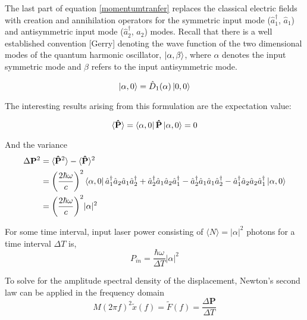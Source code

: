 		The last part of equation \ref{momentumtranfer} replaces the classical electric fields with creation and annihilation operators for the symmetric input mode ($\hat{a}_1^{\dagger}$, $\hat{a}_1$) and antisymmetric input mode ($\hat{a}_2^{\dagger}$, $\hat{a}_2$) modes. Recall that there is a well established convention [Gerry] denoting the wave function of the two dimensional modes of the quantum harmonic oscillator, $\ket{\alpha,\beta}$, where $\alpha$ denotes the input symmetric mode and $\beta$ refers to the input antisymmetric mode.
		
		\begin{equation}
		\ket{\alpha,0} = \hat{D}_1(\alpha) \ket{0,0}
		\end{equation}
		
		
		
		The interesting results arising from this formulation are the expectation value:

		\begin{equation}
		\langle \mathbf{\hat{P}} \rangle = \bra{\alpha,0} \mathbf{\hat{P}}\ket{\alpha,0} = 0
		\end{equation}
		
		And the variance 
		\begin{equation} 
		\begin{aligned}
		\Delta \mathbf{P}^2 &= \langle \mathbf{\hat{P}}^2 \rangle  - \langle \mathbf{\hat{P}} \rangle^2 \\
							&= \bigg(\frac{2 \hbar \omega}{c}\bigg)^2 \bra{\alpha,0}  \hat{a}_1^{\dagger}  \hat{a}_2  \hat{a}_1  \hat{a}_2^{\dagger} + \hat{a}_2^{\dagger}  \hat{a}_1  \hat{a}_2  \hat{a}_1^{\dagger}
							- \hat{a}_2^{\dagger}  \hat{a}_1  \hat{a}_1  \hat{a}_2^{\dagger} - \hat{a}_1^{\dagger}  \hat{a}_2  \hat{a}_2  \hat{a}_1^{\dagger} \ket{\alpha,0}\\
							&= \bigg(\frac{2 \hbar \omega}{c}\bigg)^2 \vert \alpha \vert^2
		\end{aligned}
		\end{equation}
		
		
		For some time interval, input laser power consisting of $\langle N \rangle =\vert\alpha \vert^2$ photons for a time interval $\Delta T$ is,
		\begin{equation}
		P_{in} = \frac{\hbar \omega}{\Delta T} \vert \alpha \vert^2
		\end{equation}
	
		To solve for the amplitude spectral density of the displacement, Newton's second law can be applied in the frequency domain
		\begin{equation}
		M (2\pi f)^2 \tilde{x}(f) = \tilde{F}(f) = \frac{\Delta \mathbf{P}}{\Delta T}
		\end{equation}
		
